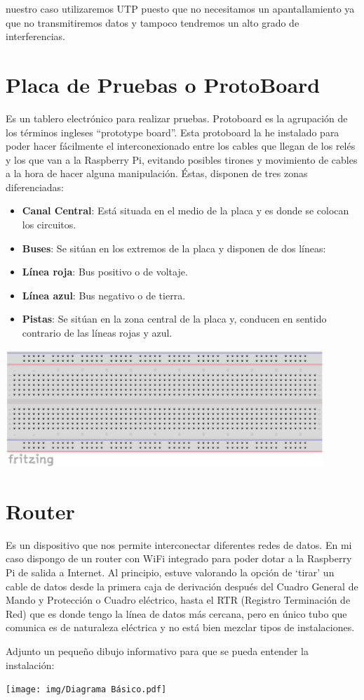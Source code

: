 \begin{itemize}
\emphEn nuestro caso utilizaremos UTP puesto que no necesitamos un apantallamiento ya que no transmitiremos datos y tampoco tendremos un alto grado de interferencias.

\section{Placa de Pruebas o ProtoBoard}
Es un tablero electrónico para realizar pruebas. Protoboard es la agrupación de los términos ingleses “prototype board”.
Esta protoboard la he instalado para poder hacer fácilmente el interconexionado entre los cables que llegan de los relés y los que van a la Raspberry Pi, evitando posibles tirones y movimiento de cables a la hora de hacer alguna manipulación.
Éstas, disponen de tres zonas diferenciadas:

\begin{itemize}
    \item \textbf{Canal Central}: Está situada en el medio de la placa y es donde se colocan los circuitos.
    \item \textbf{Buses}: Se sitúan en los extremos de la placa y disponen de dos líneas:
    \item \textbf{Línea roja}: Bus positivo o de voltaje.
    \item \textbf{Línea azul}: Bus negativo o de tierra.
    \item \textbf{Pistas}: Se sitúan en la zona central de la placa y, conducen en sentido contrario de las líneas rojas y azul.
\end{itemize}

\begin{center}
\includegraphics[width=0.9\textwidth]{img/protoboard.pdf}
\end{center}

\section{Router}
Es un dispositivo que nos permite interconectar diferentes redes de datos. En mi caso dispongo de un router con WiFi integrado para poder dotar a la Raspberry Pi de salida a Internet.
Al principio, estuve valorando la opción de ‘tirar’ un cable de datos desde la primera caja de derivación después del Cuadro General de Mando y Protección o Cuadro eléctrico, hasta el RTR (Registro Terminación de Red) que es donde tengo la línea de datos más cercana, pero en único tubo que comunica es de naturaleza eléctrica y no está bien mezclar tipos de instalaciones.

Adjunto un pequeño dibujo informativo para que se pueda entender la instalación:
\begin{center}
\texttt{[image: img/Diagrama Básico.pdf]}
\end{center}


\end{itemize}

